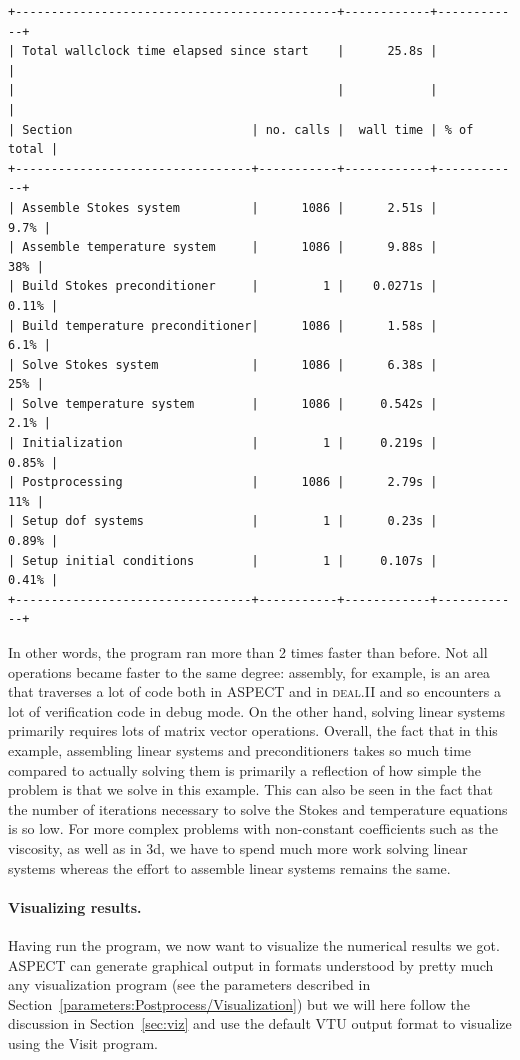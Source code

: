 \documentclass{article}
\newcommand{\dealii}{{\textsc{deal.II}}}
\newcommand{\aspect}{\textsc{ASPECT}}
\begin{document}
\begin{lstlisting}[frame=single,language=ksh]
+---------------------------------------------+------------+------------+
| Total wallclock time elapsed since start    |      25.8s |            |
|                                             |            |            |
| Section                         | no. calls |  wall time | % of total |
+---------------------------------+-----------+------------+------------+
| Assemble Stokes system          |      1086 |      2.51s |       9.7% |
| Assemble temperature system     |      1086 |      9.88s |        38% |
| Build Stokes preconditioner     |         1 |    0.0271s |      0.11% |
| Build temperature preconditioner|      1086 |      1.58s |       6.1% |
| Solve Stokes system             |      1086 |      6.38s |        25% |
| Solve temperature system        |      1086 |     0.542s |       2.1% |
| Initialization                  |         1 |     0.219s |      0.85% |
| Postprocessing                  |      1086 |      2.79s |        11% |
| Setup dof systems               |         1 |      0.23s |      0.89% |
| Setup initial conditions        |         1 |     0.107s |      0.41% |
+---------------------------------+-----------+------------+------------+
\end{lstlisting}

In other words, the program ran more than 2 times faster than before. Not all
operations became faster to the same degree: assembly, for example, is an area
that traverses a lot of code both in \aspect{} and in \dealii{} and so
encounters a lot of verification code in debug mode. On the other hand, solving
linear systems primarily requires lots of matrix vector operations. Overall, the
fact that in this example, assembling linear systems and preconditioners takes
so much time compared to actually solving them is primarily a reflection of how
simple the problem is that we solve in this example. This can also be seen in
the fact that the number of iterations necessary to solve the Stokes and
temperature equations is so low. For more complex problems with non-constant
coefficients such as the viscosity, as well as in 3d, we have to spend much more
work solving linear systems whereas the effort to assemble linear systems
remains the same.

\paragraph{Visualizing results.}
Having run the program, we now want to visualize the numerical results we got.
\aspect{} can generate graphical output in formats understood by pretty much any
visualization program (see the parameters described in
Section~\ref{parameters:Postprocess/Visualization}) but we will here follow the
discussion in Section~\ref{sec:viz} and use the default VTU output format to
visualize using the Visit program.
\end{document}
